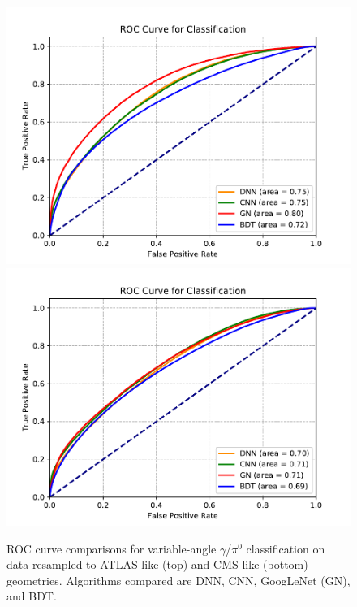 \begin{figure}[htbp]
    \centering
    \includegraphics[scale=0.5, clip]{Images/Calo/classification_ROC_ATLAS.pdf}
    \includegraphics[scale=0.5, clip]{Images/Calo/classification_ROC_CMS.pdf}
    \caption{ROC curve comparisons for variable-angle $\gamma$/$\pi^0$ classification on data resampled to ATLAS-like (top) and CMS-like (bottom) geometries. Algorithms compared are DNN, CNN, GoogLeNet (GN), and BDT.}
    \label{fig:class_ROC_ATLAS_CMS}
\end{figure}


